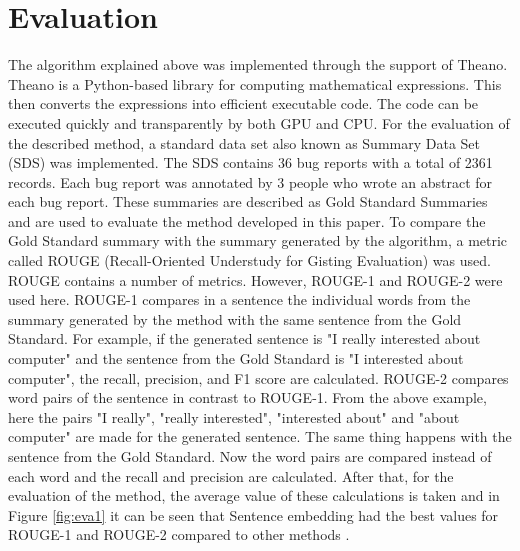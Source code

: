 \documentclass[a4paper,10pt, bibliography=totocnumbered]{scrreprt}
\begin{document}
\section{Evaluation}
The algorithm explained above was implemented through the support of Theano. Theano is a Python-based library for computing mathematical expressions. This then converts the expressions into efficient executable code. The code can be executed quickly and transparently by both GPU and CPU.
For the evaluation of the described method, a standard data set also known as Summary Data Set (SDS) was implemented. The SDS contains 36 bug reports with a total of 2361 records. Each bug report was annotated by 3 people who wrote an abstract for each bug report. These summaries are described as Gold Standard Summaries and are used to evaluate the method developed in this paper. 
To compare the Gold Standard summary with the summary generated by the algorithm, a metric called ROUGE (Recall-Oriented Understudy for Gisting Evaluation) was used. ROUGE contains a number of metrics. However, ROUGE-1 and ROUGE-2 were used here. ROUGE-1 compares in a sentence the individual words from the summary generated by the method with the same sentence from the Gold Standard. For example, if the generated sentence is "I really interested about computer" and the sentence from the Gold Standard is "I interested about computer", the recall, precision, and F1 score are calculated. ROUGE-2 compares word pairs of the sentence in contrast to ROUGE-1. From the above example, here the pairs "I really", "really interested", "interested about" and "about computer" are made for the generated sentence. The same thing happens with the sentence from the Gold Standard. Now the word pairs are compared instead of each word and the recall and precision are calculated. After that, for the evaluation of the method, the average value of these calculations is taken and in Figure \ref{fig:eva1} it can be seen that Sentence embedding had the best values for ROUGE-1 and ROUGE-2 compared to other methods \cite{lin}.
\end{document}
